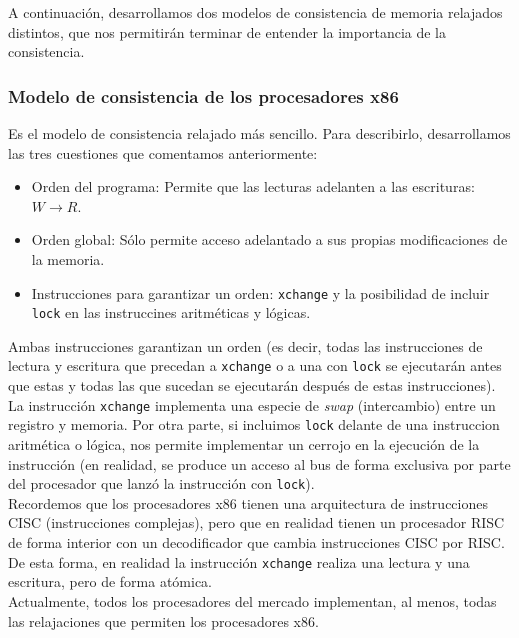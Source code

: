 A continuación, desarrollamos dos modelos de consistencia de memoria relajados distintos, que nos permitirán terminar de entender la importancia de la consistencia.

\subsubsection{Modelo de consistencia de los procesadores x86}
Es el modelo de consistencia relajado más sencillo. Para describirlo, desarrollamos las tres cuestiones que comentamos anteriormente:
\begin{itemize}
    \item Orden del programa: Permite que las lecturas adelanten a las escrituras: ${W\rightarrow R}$.
    \item Orden global: Sólo permite acceso adelantado a sus propias modificaciones de la memoria.
    \item Instrucciones para garantizar un orden: \verb|xchange| y la posibilidad de incluir \verb|lock| en las instruccines aritméticas y lógicas.
\end{itemize}
Ambas instrucciones garantizan un orden (es decir, todas las instrucciones de lectura y escritura que precedan a \verb|xchange| o a una con \verb|lock| se ejecutarán antes que estas y todas las que sucedan se ejecutarán después de estas instrucciones). La instrucción \verb|xchange| implementa una especie de \emph{swap} (intercambio) entre un registro y memoria. Por otra parte, si incluimos \verb|lock| delante de una instruccion aritmética o lógica, nos permite implementar un cerrojo en la ejecución de la instrucción (en realidad, se produce un acceso al bus de forma exclusiva por parte del procesador que lanzó la instrucción con \verb|lock|).\\

Recordemos que los procesadores x86 tienen una arquitectura de instrucciones CISC (instrucciones complejas), pero que en realidad tienen un procesador RISC de forma interior con un decodificador que cambia instrucciones CISC por RISC\@. De esta forma, en realidad la instrucción \verb|xchange| realiza una lectura y una escritura, pero de forma atómica.\\

Actualmente, todos los procesadores del mercado implementan, al menos, todas las relajaciones que permiten los procesadores x86.

